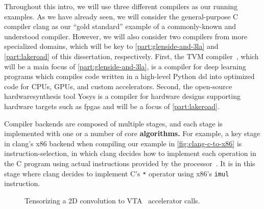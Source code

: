 Throughout this intro,
  we will use three different compilers
  as our running examples.
As we have already seen, we will
  consider the
  general-purpose C compiler
  clang
  as our ``gold standard'' example
  of a commonly-known
  and understood compiler.
However, we will also consider
  two compilers from more specialized
  domains,
  which will be key to
  \cref{part:glenside-and-3la}
  and
  \cref{part:lakeroad}
  of this dissertation,
  respectively.
First,
  the TVM compiler~\cite{chen2018tvm},
  which will be a main focus
  of \cref{part:glenside-and-3la},
  is a compiler for deep learning
  programs
  which compiles code written in a
  high-level
  Python
  \gls{dsl}
  into optimized code
  for CPUs, GPUs,
  and custom \glspl{accelerator}.
Second,
  the open-source \gls{hardwaresynthesis}
  tool Yosys
  is a compiler for hardware designs
  supporting hardware targets such as
  \glspl{fpga}
  and will be a focus of
  \cref{part:lakeroad}.

Compiler backends are composed
  of multiple stages,
  and each stage is implemented with
  one or a number of core
  \textbf{algorithms.}
For example, a key stage in clang's x86 backend
  when compiling our example in
  \cref{fig:clang-c-to-x86}
  is
  \gls{instruction-selection},
  in which clang decides how to implement
  each operation in the C program
  using actual instructions
  provided by the processor~\cite{llvminstructionselection}.
It is in this stage
  where clang decides to
  implement
  C's \texttt{*} operator
  using x86's
  \texttt{imul} instruction.

\begin{figure}
\centering
{}
\caption{Tensorizing a 2D convolution to VTA~\cite{moreau2018vta} accelerator calls.}
\label{fig:intro:tensorization}
\end{figure}


